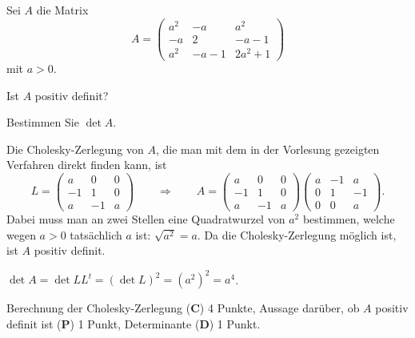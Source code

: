 %
Sei $A$ die Matrix
\[
A
=
\begin{pmatrix}
a^2     &   -a    &   a^2    \\
-a      &    2    & -a-1     \\
a^2     &  -a-1   & 2a^2 + 1
\end{pmatrix}
\]
mit $a>0$.
\begin{teilaufgaben}
\item
Ist $A$ positiv definit?
\item
Bestimmen Sie $\det A$.
\end{teilaufgaben}

\begin{loesung}
\begin{teilaufgaben}
\item
Die Cholesky-Zerlegung von $A$, die man mit dem in der Vorlesung
gezeigten Verfahren direkt finden kann, ist
\[
L=
\begin{pmatrix}
 a& 0& 0\\
-1& 1& 0\\
 a&-1& a
\end{pmatrix}
\qquad\Rightarrow\qquad
A
=
\begin{pmatrix}
 a& 0& 0\\
-1& 1& 0\\
 a&-1& a
\end{pmatrix}
\begin{pmatrix}
 a&-1& a\\
 0& 1&-1\\
 0& 0& a
\end{pmatrix}.
\]
Dabei muss man an zwei Stellen eine Quadratwurzel von $a^2$ bestimmen,
welche wegen $a>0$ tatsächlich $a$ ist: $\sqrt{a^2}=a$.
Da die Cholesky-Zerlegung möglich ist, ist $A$ positiv definit.
\item
$\det A = \det LL^t =(\det L)^2 = (a^2)^2 = a^4$.
\qedhere
\end{teilaufgaben}
\end{loesung}

\begin{bewertung}
Berechnung der Cholesky-Zerlegung ({\bf C}) 4 Punkte,
Aussage darüber, ob $A$ positiv definit ist ({\bf P}) 1 Punkt,
Determinante ({\bf D}) 1 Punkt.
\end{bewertung}
